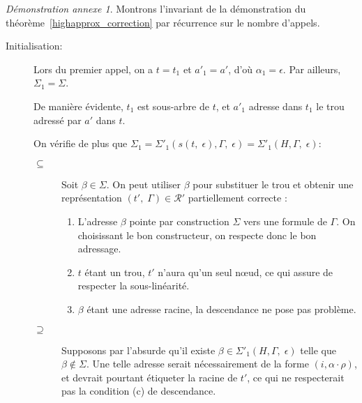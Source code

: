 \documentclass[11pt,a4paper]{article}
\theoremstyle{plain}
\theoremstyle{definition}
\theoremstyle{remark}
\newtheorem{demonstrationappendix}{Démonstration annexe}
\newcommand*{\someadd}{\rho}
\newcommand*{\sequent}{\Gamma}
\newcommand*{\representationspartial}{\ensuremath{\mathcal{R'}}}
\newcommand*{\highapprox}{\ensuremath{\Sigma_1}}
\newcommand*{\highapproxspec}{\ensuremath{\Sigma'_1}}
\newcommand*{\treesimplify}{\ensuremath{s}}
\newcommand*{\caddpartial}{(a)}
\newcommand*{\clinpartial}{(b')}
\newcommand*{\cdespartial}{(c)}
\begin{document}
\begin{demonstrationappendix}
    \label{highapprox_correction_proof}
    Montrons l'invariant de la démonstration du théorème~\ref{highapprox_correction} par récurrence sur le nombre d'appels.

    \begin{description}
        \item[Initialisation:]
            Lors du premier appel, on a $t = t_1$ et $a'_1 = a'$, d'où $\alpha_1 = \epsilon$. Par ailleurs, $\highapprox = \Sigma$. 
    
            De manière évidente, $t_1$ est sous-arbre de $t$, et $a'_1$ adresse dans $t_1$ le trou adressé par $a'$ dans $t$.
            
            On vérifie de plus que $\highapprox = \highapproxspec \left( \treesimplify( t, \; \epsilon ), \sequent, \; \epsilon \right) = \highapproxspec \left( H, \sequent, \; \epsilon \right)$:
    
            \begin{description}
                \item[$\subseteq$] 
                Soit $\beta \in \Sigma$. On peut utiliser $\beta$ pour substituer le trou et obtenir une représentation $(t', \; \sequent) \in \representationspartial$ partiellement correcte :
        
                \begin{enumerate}
                    \item[\caddpartial] L'adresse $\beta$ pointe par construction $\Sigma$ vers une formule de $\sequent$. On choisissant le bon constructeur, on respecte donc le bon adressage.
        
                    \item[\clinpartial] $t$ étant un trou, $t'$ n'aura qu'un seul n\oe ud, ce qui assure de respecter la sous-linéarité.
        
                    \item[\cdespartial] $\beta$ étant une adresse racine, la descendance ne pose pas problème.
                \end{enumerate}
    
                \item[$\supseteq$]
                Supposons par l'absurde qu'il existe $\beta \in \highapproxspec \left( H, \sequent, \; \epsilon \right)$ telle que $\beta \notin \Sigma$. Une telle adresse serait nécessairement de la forme $(i, \alpha \cdot \someadd)$, et devrait pourtant étiqueter la racine de $t'$, ce qui ne respecterait pas la condition \cdespartial{} de descendance.
            \end{description}


\end{description}
\end{demonstrationappendix}
\end{document}
